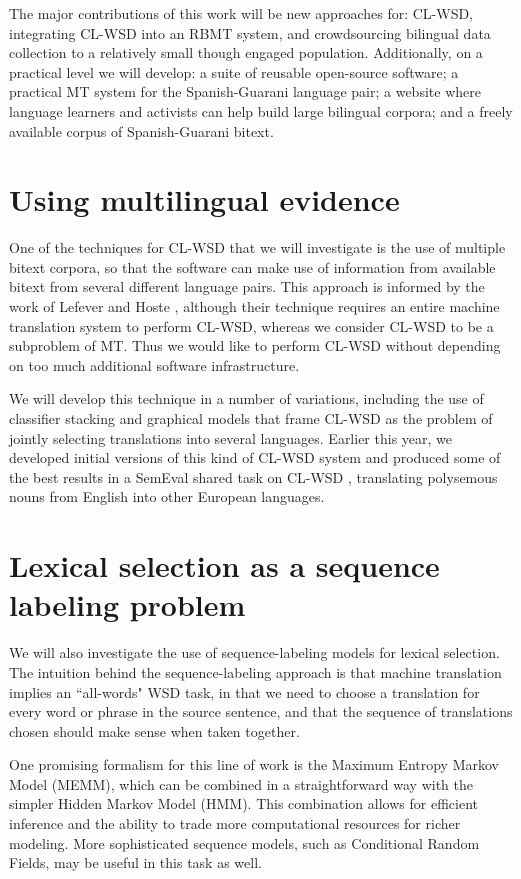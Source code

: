 \documentclass{article}
\begin{document}
The major contributions of this work will be new approaches for: CL-WSD,
integrating CL-WSD into an RBMT system, and crowdsourcing bilingual data
collection to a relatively small though engaged population.
Additionally, on a practical level we will develop: a suite of reusable
open-source software; a practical MT system for the Spanish-Guarani language
pair; a website where language learners and activists can help build large
bilingual corpora; and a freely available corpus of Spanish-Guarani bitext.

\section{Using multilingual evidence}
One of the techniques for CL-WSD that we will investigate is the use of
multiple bitext corpora, so that the software can make use of information from
available bitext from several different language pairs. This approach is
informed by the work of Lefever and Hoste
\cite{lefever-hoste-decock:2011:ACL-HLT2011}, although their technique requires
an entire machine translation system to perform CL-WSD, whereas we consider
CL-WSD to be a subproblem of MT. Thus we would like to perform CL-WSD without
depending on too much additional software infrastructure.

We will develop this technique in a number of variations, including the use of
classifier stacking and graphical models that frame CL-WSD as the problem
of jointly selecting translations into several languages. Earlier this year,
we developed initial versions of this kind of CL-WSD system
\cite{rudnick-liu-gasser:2013:SemEval-2013} and produced some of the best
results in a SemEval shared task on CL-WSD \cite{task10},
translating polysemous nouns from English into other European languages.

\section{Lexical selection as a sequence labeling problem}
We will also investigate the use of sequence-labeling models for
lexical selection.  The intuition behind the sequence-labeling approach is that
machine translation implies an ``all-words" WSD task, in that we need to choose
a translation for every word or phrase in the source sentence, and that the
sequence of translations chosen should make sense when taken together.

One promising formalism for this line of work is the Maximum
Entropy Markov Model (MEMM), which can be combined in a straightforward way
with the simpler Hidden Markov Model (HMM). This combination allows for
efficient inference and the ability to trade more computational resources for
richer modeling. More sophisticated sequence models, such as Conditional Random
Fields, may be useful in this task as well.
\end{document}
